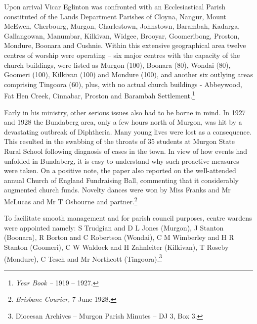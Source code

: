 Upon arrival Vicar Eglinton was confronted with an Ecclesiastical Parish constituted of the Lands Department Parishes of Cloyna, Nangur, Mount McEwen, Cherbourg, Murgon, Charlestown, Johnstown, Barambah, Kadarga, Gallangowan, Manumbar, Kilkivan, Widgee, Brooyar, Goomeribong, Proston, Mondure, Boonara and Cushnie. Within this extensive geographical area twelve centres of worship were operating -- six major centres with the capacity of the church buildings, were listed as Murgon (100), Boonara (80), Wondai (80), Goomeri (100), Kilkivan (100) and Mondure (100), and another six outlying areas comprising Tingoora (60), plus, with no actual church buildings - Abbeywood, Fat Hen Creek, Cinnabar, Proston and Barambah Settlement.\footnote{\emph{Year Book --} 1919 -- 1927.}


Early in his ministry, other serious issues also had to be borne in mind. In 1927 and 1928 the Bundaberg area, only a few hours north of Murgon, was hit by a devastating outbreak of Diphtheria. Many young lives were lost as a consequence. This resulted in the swabbing of the throats of 35 students at Murgon State Rural School following diagnosis of cases in the town. In view of how events had unfolded in Bundaberg, it is easy to understand why such proactive measures were taken. On a positive note, the paper also reported on the well-attended annual Church of England Fundraising Ball, commenting that it considerably augmented church funds. Novelty dances were won by Miss Franks and Mr McLucas and Mr T Osbourne and partner.\footnote{\emph{Brisbane Courier,} 7 June 1928\emph{.}}


To facilitate smooth management and for parish council purposes, centre wardens were appointed namely: S Trudgian and D L Jones (Murgon), J Stanton (Boonara), R Borton and C Robertson (Wondai), C M Wimberley and H R Stanton (Goomeri), C W Waldock and H Zahnleiter (Kilkivan), T Roseby (Mondure), C Tesch and Mr Northcott (Tingoora).\footnote{Diocesan Archives -- Murgon Parish Minutes -- DJ 3, Box 3.}


